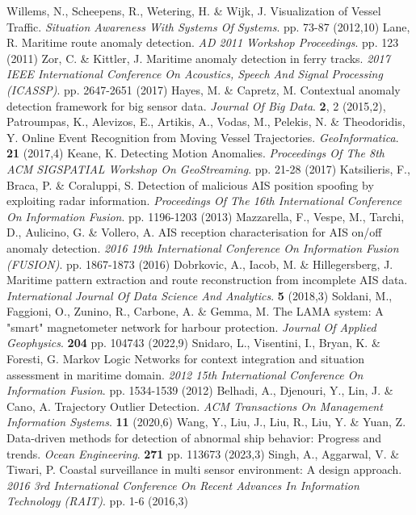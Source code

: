 Willems, N., Scheepens, R., Wetering, H. \& Wijk, J. Visualization of Vessel Traffic. {\em Situation Awareness With Systems Of Systems}. pp. 73-87 (2012,10)
Lane, R. Maritime route anomaly detection. {\em AD 2011 Workshop Proceedings}. pp. 123 (2011)
Zor, C. \& Kittler, J. Maritime anomaly detection in ferry tracks. {\em 2017 IEEE International Conference On Acoustics, Speech And Signal Processing (ICASSP)}. pp. 2647-2651 (2017)
Hayes, M. \& Capretz, M. Contextual anomaly detection framework for big sensor data. {\em Journal Of Big Data}. \textbf{2}, 2 (2015,2),
Patroumpas, K., Alevizos, E., Artikis, A., Vodas, M., Pelekis, N. \& Theodoridis, Y. Online Event Recognition from Moving Vessel Trajectories. {\em GeoInformatica}. \textbf{21} (2017,4)
Keane, K. Detecting Motion Anomalies. {\em Proceedings Of The 8th ACM SIGSPATIAL Workshop On GeoStreaming}. pp. 21-28 (2017)
Katsilieris, F., Braca, P. \& Coraluppi, S. Detection of malicious AIS position spoofing by exploiting radar information. {\em Proceedings Of The 16th International Conference On Information Fusion}. pp. 1196-1203 (2013)
Mazzarella, F., Vespe, M., Tarchi, D., Aulicino, G. \& Vollero, A. AIS reception characterisation for AIS on/off anomaly detection. {\em 2016 19th International Conference On Information Fusion (FUSION)}. pp. 1867-1873 (2016)
Dobrkovic, A., Iacob, M. \& Hillegersberg, J. Maritime pattern extraction and route reconstruction from incomplete AIS data. {\em International Journal Of Data Science And Analytics}. \textbf{5} (2018,3)
Soldani, M., Faggioni, O., Zunino, R., Carbone, A. \& Gemma, M. The LAMA system: A "smart" magnetometer network for harbour protection. {\em Journal Of Applied Geophysics}. \textbf{204} pp. 104743 (2022,9)
Snidaro, L., Visentini, I., Bryan, K. \& Foresti, G. Markov Logic Networks for context integration and situation assessment in maritime domain. {\em 2012 15th International Conference On Information Fusion}. pp. 1534-1539 (2012)
Belhadi, A., Djenouri, Y., Lin, J. \& Cano, A. Trajectory Outlier Detection. {\em ACM Transactions On Management Information Systems}. \textbf{11} (2020,6)
Wang, Y., Liu, J., Liu, R., Liu, Y. \& Yuan, Z. Data-driven methods for detection of abnormal ship behavior: Progress and trends. {\em Ocean Engineering}. \textbf{271} pp. 113673 (2023,3)
Singh, A., Aggarwal, V. \& Tiwari, P. Coastal surveillance in multi sensor environment: A design approach. {\em 2016 3rd International Conference On Recent Advances In Information Technology (RAIT)}. pp. 1-6 (2016,3)
